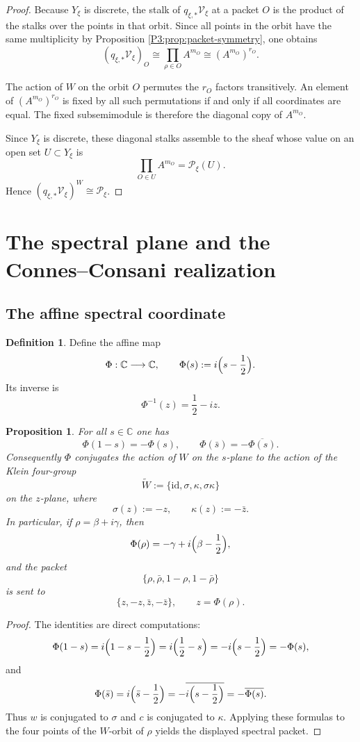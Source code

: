 \documentclass[11pt,a4paper]{article}
\numberwithin{equation}{section}
\newtheorem{proposition}[theorem]{Proposition}
\theoremstyle{definition}
\newtheorem{definition}[theorem]{Definition}
\theoremstyle{remark}
\newcommand{\CC}{\mathbb C}
\newcommand{\cP}{\mathcal P}
\newcommand{\cV}{\mathcal V}
\begin{document}
\begin{proof}
Because $Y_\xi$ is discrete, the stalk of $q_{\xi,*}\cV_\xi$ at a packet $O$ is the product of the stalks over the points in that orbit.  Since all points in the orbit have the same multiplicity by Proposition \ref{P3:prop:packet-symmetry}, one obtains
\[
(q_{\xi,*}\cV_\xi)_O\cong \prod_{\rho\in O} A^{m_O}\cong (A^{m_O})^{r_O}.
\]

The action of $W$ on the orbit $O$ permutes the $r_O$ factors transitively.  An element of $(A^{m_O})^{r_O}$ is fixed by all such permutations if and only if all coordinates are equal.  The fixed subsemimodule is therefore the diagonal copy of $A^{m_O}$.

Since $Y_\xi$ is discrete, these diagonal stalks assemble to the sheaf whose value on an open set $U\subset Y_\xi$ is
\[
\prod_{O\in U} A^{m_O}=\cP_\xi(U).
\]
Hence $(q_{\xi,*}\cV_\xi)^W\cong \cP_\xi$.
\end{proof}

\section{The spectral plane and the Connes--Consani realization}

\subsection{The affine spectral coordinate}

\begin{definition}
Define the affine map
\[
\Phi:\CC\longrightarrow\CC,
\qquad
\Phi(s):=i\Bigl(s-\frac12\Bigr).
\]
Its inverse is
\[
\Phi^{-1}(z)=\frac12-iz.
\]
\end{definition}

\begin{proposition}\label{P3:prop:Phi-symmetry}
For all $s\in\CC$ one has
\[
\Phi(1-s)=-\Phi(s),
\qquad
\Phi(\bar s)=-\overline{\Phi(s)}.
\]
Consequently $\Phi$ conjugates the action of $W$ on the $s$-plane to the action of the Klein four-group
\[
\widetilde W:=\{\mathrm{id},\sigma,\kappa,\sigma\kappa\}
\]
on the $z$-plane, where
\[
\sigma(z):=-z,
\qquad
\kappa(z):=-\bar z.
\]
In particular, if $\rho=\beta+i\gamma$, then
\[
\Phi(\rho)=-\gamma+i\Bigl(\beta-\frac12\Bigr),
\]
and the packet
\[
\{\rho,\bar\rho,1-\rho,1-\bar\rho\}
\]
is sent to
\[
\{z,-z,\bar z,-\bar z\},
\qquad z=\Phi(\rho).
\]
\end{proposition}

\begin{proof}
The identities are direct computations:
\[
\Phi(1-s)=i\Bigl(1-s-\frac12\Bigr)=i\Bigl(\frac12-s\Bigr)=-i\Bigl(s-\frac12\Bigr)=-\Phi(s),
\]
and
\[
\Phi(\bar s)=i\Bigl(\bar s-\frac12\Bigr)=-\overline{i\Bigl(s-\frac12\Bigr)}=-\overline{\Phi(s)}.
\]
Thus $w$ is conjugated to $\sigma$ and $c$ is conjugated to $\kappa$.  Applying these formulas to the four points of the $W$-orbit of $\rho$ yields the displayed spectral packet.
\end{proof}
\end{document}
